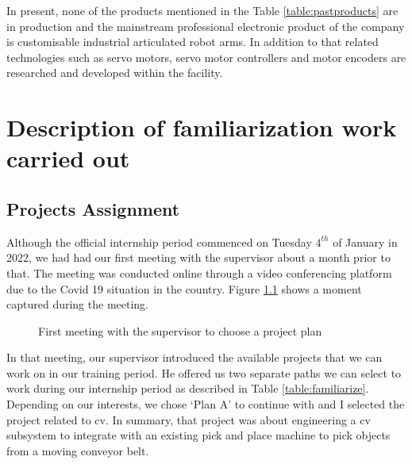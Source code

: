 \documentclass[a4paper,12pt]{report}
\begin{document}
In present, none of the products mentioned in the Table \ref{table:pastproducts} are in production and the mainstream professional electronic product of the company is customisable industrial articulated robot arms. In addition to that related technologies such as servo motors, servo motor controllers and motor encoders  are researched and developed within the facility.

\chapter{Description of familiarization work carried out}
\section{Projects Assignment}

Although the official internship period commenced on Tuesday $4^{th}$ of January in 2022, we had had our first meeting with the supervisor about a month prior to that. The meeting was conducted online through a video conferencing platform due to the Covid 19 situation in the country. Figure \ref{fig:firstmeet} shows a moment captured during the meeting.

\begin{figure}[h]
	\centering
	
	\caption{First meeting with the supervisor to choose a project plan}
	\label{fig:firstmeet}
\end{figure}

In that meeting, our supervisor introduced the available projects that we can work on in our training period. He offered us two separate paths we can select to work during our internship period as described in Table \ref{table:familiarize}. Depending on our interests, we chose  `Plan A' to continue with and I selected the project related to \ac{cv}. In summary, that project was about engineering a \ac{cv} subsystem to integrate with an existing pick and place machine to pick objects from a moving conveyor belt.
\end{document}

